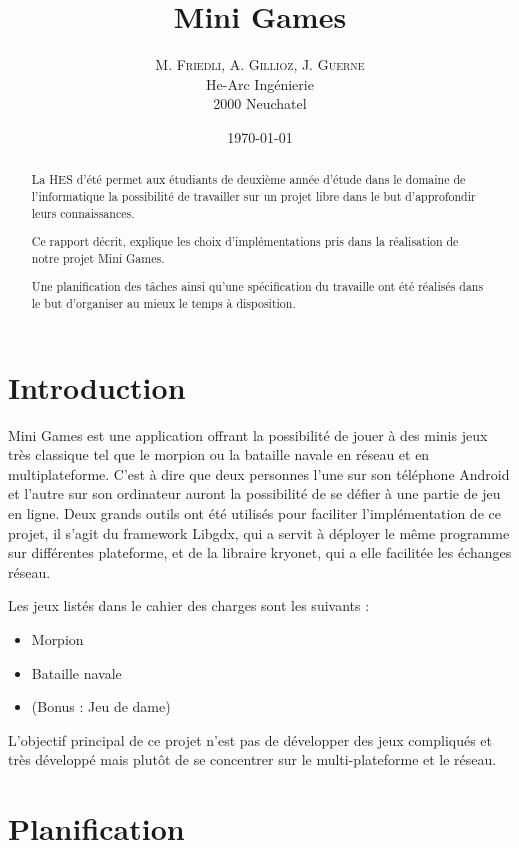 \documentclass{report}
\title{Mini Games}
\author{M. \textsc{Friedli}, A. \textsc{Gillioz}, J. \textsc{Guerne}\\
He-Arc Ingénierie\\
2000 Neuchatel}
\date{\today{}}
\begin{document}
\maketitle{}

\begin{abstract}
La HES d'été permet aux étudiants de deuxième année d'étude dans le domaine de l'informatique
la possibilité de travailler sur un projet libre dans le but d'approfondir leurs connaissances.

Ce rapport décrit, explique les choix d'implémentations pris dans la réalisation de notre
projet Mini Games.

Une planification des tâches ainsi qu'une spécification du travaille ont été réalisés dans le but
d'organiser au mieux le temps à disposition.
\end{abstract}
\tableofcontents

\chapter{Introduction}
Mini Games est une application offrant la possibilité de jouer à des minis jeux très classique tel
que le morpion ou la bataille navale en réseau et en multiplateforme. C'est à dire que deux personnes
l'une sur son téléphone Android et l'autre sur son ordinateur auront la possibilité de se défier à une partie de jeu en ligne.
Deux grands outils ont été utilisés pour faciliter l'implémentation de ce projet, il s'agit du framework Libgdx, qui a servit à
déployer le même programme sur différentes plateforme, et de la libraire kryonet, qui a elle facilitée les échanges réseau.

Les jeux listés dans le cahier des charges sont les suivants :
\begin{itemize}
	\item Morpion
	\item Bataille navale
	\item (Bonus : Jeu de dame)
\end{itemize}
L'objectif principal de ce projet n'est pas de développer des jeux compliqués et très
développé mais plutôt de se concentrer sur le multi-plateforme et le réseau.

\chapter{Planification}
\end{document}
